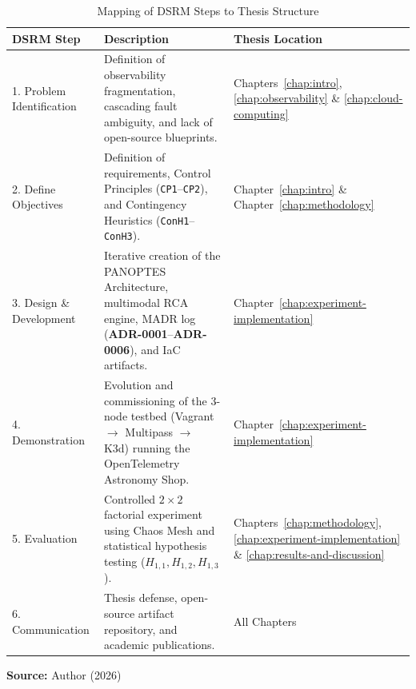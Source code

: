 \begin{table}[ht]
\centering
\footnotesize
\caption{Mapping of DSRM Steps to Thesis Structure}
\label{tab:dsrm-mapping}
\begin{tabularx}{\textwidth}{|l|X|l|}
\hline
\textbf{DSRM Step} & \textbf{Description} & \textbf{Thesis Location} \\ \hline
1. Problem Identification & Definition of observability fragmentation, cascading fault ambiguity, and lack of open-source blueprints. & Chapters~\ref{chap:intro}, \ref{chap:observability} \& \ref{chap:cloud-computing} \\ \hline
2. Define Objectives & Definition of requirements, Control Principles (\texttt{CP1}--\texttt{CP2}), and Contingency Heuristics (\texttt{ConH1}--\texttt{ConH3}). & Chapter~\ref{chap:intro} \& Chapter~\ref{chap:methodology} \\ \hline
3. Design \& Development & Iterative creation of the PANOPTES Architecture, multimodal RCA engine, MADR log (\textbf{ADR-0001}--\textbf{ADR-0006}), and IaC artifacts. & Chapter~\ref{chap:experiment-implementation} \\ \hline
4. Demonstration & Evolution and commissioning of the 3-node testbed (Vagrant $\rightarrow$ Multipass $\rightarrow$ K3d) running the OpenTelemetry Astronomy Shop. & Chapter~\ref{chap:experiment-implementation} \\ \hline
5. Evaluation & Controlled $2\times2$ factorial experiment using Chaos Mesh and statistical hypothesis testing ($H_{1,1}, H_{1,2}, H_{1,3}$). & Chapters~\ref{chap:methodology}, \ref{chap:experiment-implementation} \& \ref{chap:results-and-discussion} \\ \hline
6. Communication & Thesis defense, open-source artifact repository, and academic publications. & All Chapters \\ \hline
\end{tabularx}
\par\medskip
\ABNTEXfontereduzida\selectfont\textbf{Source:} Author (2026) 
\end{table}
